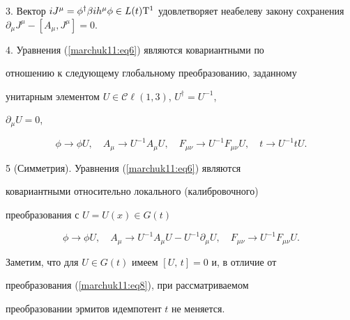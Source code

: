 \smallskip



3. Вектор $ i J^\mu=\phi^\dagger \beta i h^\mu\phi\in

L(t){\rm T}^1$ удовлетворяет неабелеву закону сохранения $

\partial_\mu J^\mu-[A_\mu, J^\mu]=0$.



\smallskip



4. Уравнения (\ref{marchuk11:eq6}) являются ковариантными по

отношению к следующему глобальному преобразованию,  заданному

унитарным элементом $U\in{\mathcal{C\!\ell}}(1, 3)$,  $U^\dagger=U^{-1}$, 

$\partial_\mu U=0$, 

\begin{equation}

\phi\to\phi U,  \quad A_\mu\to U^{-1}A_\mu U, \quad F_{\mu\nu}\to

U^{-1}F_{\mu\nu}U, \quad t\to U^{-1}t U.

\label{marchuk11:eq8}

\end{equation}



\smallskip



5 (Симметрия). Уравнения (\ref{marchuk11:eq6}) являются

ковариантными относительно локального (калибровочного)

преобразования с $U=U(x)\in G(t)$

\begin{equation}

\phi\to\phi U, \quad A_\mu\to U^{-1}A_\mu U-U^{-1}\partial_\mu

U, \quad F_{\mu\nu}\to U^{-1}F_{\mu\nu}U.

\label{marchuk11:eq9}

\end{equation}



Заметим,  что для $U\in G(t)$ имеем $[U, \,t]=0$ и,  в отличие от

преобразования (\ref{marchuk11:eq8}),  при  рассматриваемом

преобразовании эрмитов идемпотент $t$ не меняется.



\smallskip



